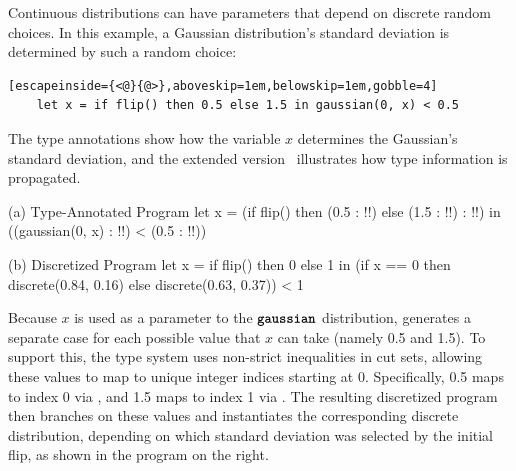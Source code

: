 Continuous distributions can have parameters that depend on discrete random choices. In this example, a Gaussian distribution's standard deviation is determined by such a random choice:

\begin{lstlisting}[escapeinside={<@}{@>},aboveskip=1em,belowskip=1em,gobble=4]
    let x = if flip() then 0.5 else 1.5 in gaussian(0, x) < 0.5
\end{lstlisting}

\noindent %
The type annotations show how the variable $x$ determines the Gaussian's standard deviation, and the extended version~\cite[Figure~19]{Wu2026SliceExtended} illustrates how type information is propagated.

\begin{tcbraster}[
    raster columns=5,
    raster equal height=rows,
    raster before skip=1.5em,
    raster after skip=1.5em,
    raster column skip=0.8em]
    \begin{programpanel}[raster multicolumn=3]{(a) Type-Annotated Program}
let x =
  (if flip() then
      (0.5 : !{}!)
    else
      (1.5 : !{}!)
  : !{}!)
in
((gaussian(0, x) : !{}!)
  < (0.5 : !{}!))
    \end{programpanel}
    \begin{programpanel}[raster multicolumn=2]{(b) Discretized Program}
let x =
  if flip() then 0 else 1
in
(if x == 0 then
    discrete(0.84, 0.16)
  else
    discrete(0.63, 0.37)) < 1
    \end{programpanel}
\end{tcbraster}
\label{fig:examples:5}

\noindent Because $x$ is used as a parameter to the $\textnormal{\ttfamily\bfseries gaussian}$ distribution, \Slice{} generates a separate case for each possible value that $x$ can take (namely 0.5 and 1.5). To support this, the type system uses non-strict inequalities in cut sets, allowing these values to map to unique integer indices starting at 0. Specifically, 0.5 maps to index 0 via , and 1.5 maps to index 1 via . The resulting discretized program then branches on these values and instantiates the corresponding discrete distribution, depending on which standard deviation was selected by the initial flip, as shown in the program on the right.

